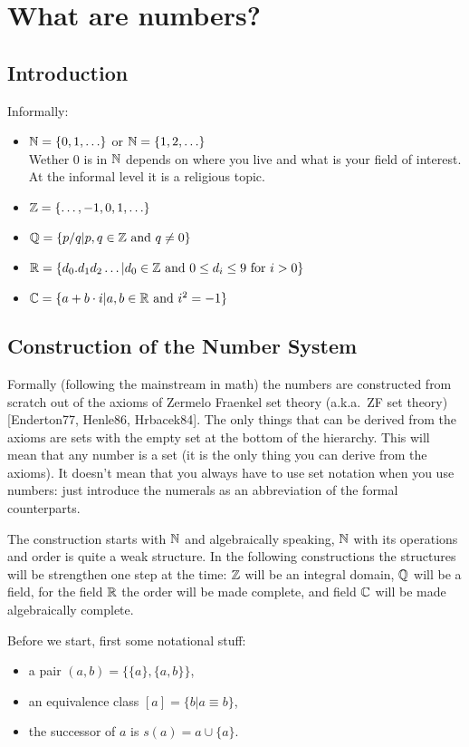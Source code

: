 \section{What are numbers?}

\subsection{Introduction}

Informally:
\begin{itemize}
  \item $\mathbb N = \{0,1,\ldots\}$ or $\mathbb N = \{1,2,\ldots\}$ \\
  Wether $0$ is in $\mathbb N$ depends on where you live and what is your field
  of interest. At the informal level it is a religious topic.
  \item $\mathbb Z = \{\ldots,-1,0,1,\ldots\}$
  \item $\mathbb Q = \{p/q | p, q \in \mathbb Z \mbox{ and } q \neq 0\}$
  \item $\mathbb R = \{d_0.d_1d_2\ldots | d_0 \in \mathbb Z \mbox{ and } 0 \leq d_i
  \leq 9 \mbox{ for } i>0\}$
  \item $\mathbb C = \{a+b \cdot i | a, b \in \mathbb R \mbox{ and } i^2 = -1\}$
\end{itemize}

\subsection{Construction of the Number System}

Formally (following the mainstream in math) the numbers are constructed
from scratch out of the axioms of Zermelo Fraenkel set theory (a.k.a.\
ZF set theory) [Enderton77, Henle86, Hrbacek84]. The only things that
can be derived from the axioms are sets with the empty set at the bottom
of the hierarchy.  This will mean that any number is a set (it is the
only thing you can derive from the axioms). It doesn't mean that you
always have to use set notation when you use numbers: just introduce the
numerals as an abbreviation of the formal counterparts.

The construction starts with $\mathbb N$ and algebraically speaking, $\mathbb N$ with
its operations and order is quite a weak structure. In the following
constructions the structures will be strengthen one step at the time:
$\mathbb Z$ will be an integral domain, $\mathbb Q$ will be a field, for the field
$\mathbb R$ the order will be made complete, and field $\mathbb C$ will be made
algebraically complete.

Before we start, first some notational stuff:
\begin{itemize}
  \item a pair $(a,b) = \{\{a\},\{a,b\}\}$,
  \item an equivalence class $[a] = \{b | a \equiv b\}$,
  \item the successor of $a$ is $s(a) = a \cup \{a\}$.
\end{itemize}

